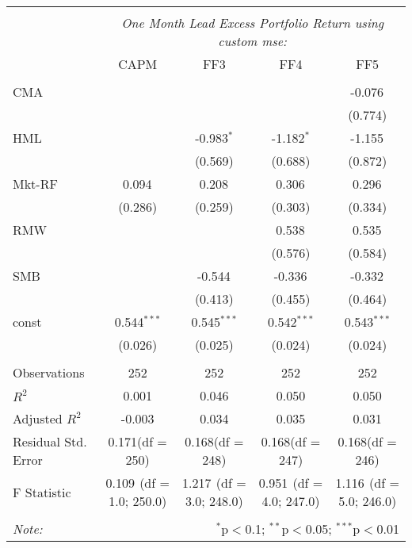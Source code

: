 \begin{table}[!htbp] \centering
\begin{tabular}{@{\extracolsep{5pt}}lcccc}
\\[-1.8ex]\hline
\hline \\[-1.8ex]
& \multicolumn{4}{c}{\textit{One Month Lead Excess Portfolio Return using custom mse:}} \
\cr \cline{4-5}
\\[-1.8ex] & CAPM & FF3 & FF4 & FF5 \\
\hline \\[-1.8ex]
 CMA & & & & -0.076$^{}$ \\
  & & & & (0.774) \\
 HML & & -0.983$^{*}$ & -1.182$^{*}$ & -1.155$^{}$ \\
  & & (0.569) & (0.688) & (0.872) \\
 Mkt-RF & 0.094$^{}$ & 0.208$^{}$ & 0.306$^{}$ & 0.296$^{}$ \\
  & (0.286) & (0.259) & (0.303) & (0.334) \\
 RMW & & & 0.538$^{}$ & 0.535$^{}$ \\
  & & & (0.576) & (0.584) \\
 SMB & & -0.544$^{}$ & -0.336$^{}$ & -0.332$^{}$ \\
  & & (0.413) & (0.455) & (0.464) \\
 const & 0.544$^{***}$ & 0.545$^{***}$ & 0.542$^{***}$ & 0.543$^{***}$ \\
  & (0.026) & (0.025) & (0.024) & (0.024) \\
\hline \\[-1.8ex]
 Observations & 252 & 252 & 252 & 252 \\
 $R^2$ & 0.001 & 0.046 & 0.050 & 0.050 \\
 Adjusted $R^2$ & -0.003 & 0.034 & 0.035 & 0.031 \\
 Residual Std. Error & 0.171(df = 250) & 0.168(df = 248) & 0.168(df = 247) & 0.168(df = 246)  \\
 F Statistic & 0.109$^{}$ (df = 1.0; 250.0) & 1.217$^{}$ (df = 3.0; 248.0) & 0.951$^{}$ (df = 4.0; 247.0) & 1.116$^{}$ (df = 5.0; 246.0) \\
\hline
\hline \\[-1.8ex]
\textit{Note:} & \multicolumn{4}{r}{$^{*}$p$<$0.1; $^{**}$p$<$0.05; $^{***}$p$<$0.01} \\
\end{tabular}
\end{table}
